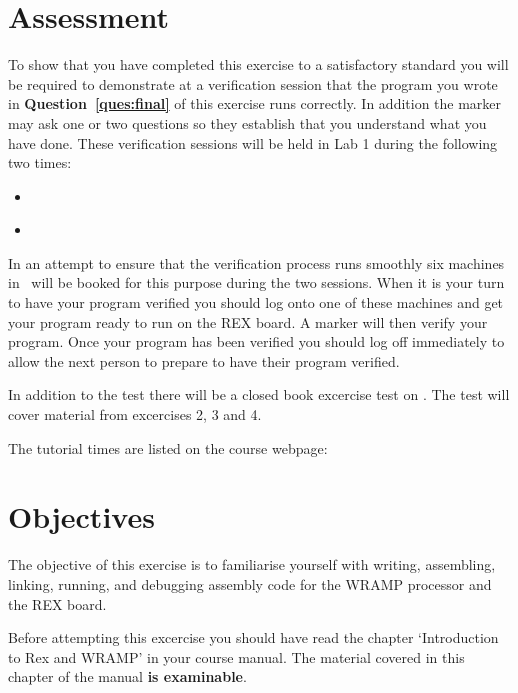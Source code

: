 \documentclass[a4paper,10pt]{article}
\begin{document}


\section{Assessment}
To show that you have completed this exercise to a satisfactory
standard you will be required to demonstrate at a verification session
that the program you wrote in \textbf{Question~\ref{ques:final}} 
of this exercise
runs correctly. In addition the marker may ask one or two questions so
they establish that you understand what you have done.  These
verification sessions will be held in Lab 1 during the following two
times:

\begin{itemize}
\item \INTRODUE~\MORNINGASSESS
\item \INTRODUE~\AFTERNOONASSESS 
\end{itemize}

In an attempt to ensure that the verification process runs smoothly
six machines in \ASSESSROOM\ will be booked for this purpose during the two
sessions. When it is your turn to have your program verified you
should log onto one of these machines and get your program ready to
run on the REX board. A marker will then verify your program. Once
your program has been verified you should log off immediately to allow
the next person to prepare to have their program verified.

In addition to the test there will be a closed book excercise test on
\textbf{\CWRAMPTEST}.  The test will cover material 
from excercises 2, 3 and 4.

The tutorial times are listed on the course webpage:

\begin{center}
\src{\WEBPAGEBASE}
\end{center}

\section{Objectives}
The objective of this exercise is to familiarise 
yourself with writing, assembling, linking, running, and
debugging assembly code for the WRAMP processor and the REX board.

Before attempting this excercise you should have read the 
chapter `Introduction to Rex and WRAMP' in your course manual.  The material covered in this chapter of the manual \textbf{is examinable}.
\end{document}
